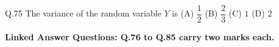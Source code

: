 \documentclass{article}
\begin{document}
																																																																																																																				   Q.75 \quad The variance of the random variable $Y$ is
																																																																																																																				   \vspace{1em} \newline 
																																																																																																																				   (A) $\dfrac{1}{2}$ \hspace{2cm} (B) $\dfrac{2}{3}$ \hspace{2cm} (C) $1$ \hspace{2cm} (D) $2$
																																																																																																																				   \vspace{1em} \newline
																																																																																																																				   \vspace{1em}


																																																																																																																				   \begin{center}
																																																																																																																				    \textbf{Linked Answer Questions: Q.76 to Q.85 carry two marks each.}   
																																																																																																																				    \end{center}
																																																																																																																				    \vspace{1em}
\end{document}
